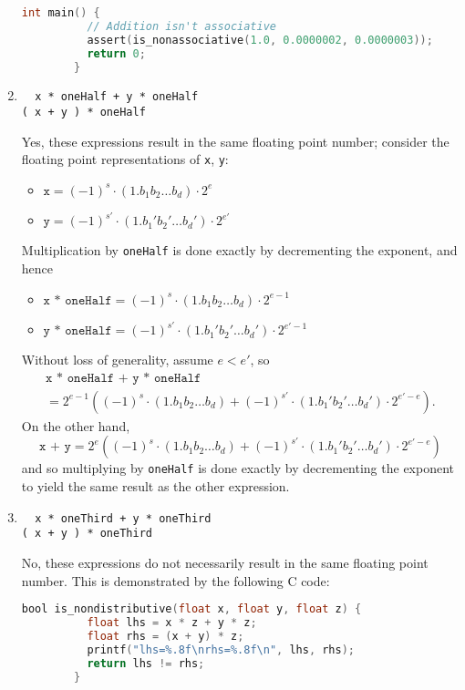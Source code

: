 \documentclass{../../../kin_math}
\begin{document}
\begin{questions}
\begin{enumerate}
\begin{solution}
\begin{lstlisting}[language=C]
        int main() {
          // Addition isn't associative
          assert(is_nonassociative(1.0, 0.0000002, 0.0000003));
          return 0;
        }
      \end{lstlisting}
    \end{solution}
    \item \begin{verbatim}
  x * oneHalf + y * oneHalf
( x + y ) * oneHalf\end{verbatim}
    \begin{solution}
      Yes, these expressions result in the same floating point number; consider the floating point representations of \texttt{x}, \texttt{y}:
      \begin{itemize}
        \item $\texttt{x} = (-1)^{s} \cdot (1.b_1b_2\dots b_d) \cdot 2^e$
        \item $\texttt{y} = (-1)^{s'} \cdot (1.b_1'b_2'\dots b_d') \cdot 2^{e'}$
      \end{itemize}
      Multiplication by \texttt{oneHalf} is done exactly by decrementing the exponent, and hence
      \begin{itemize}
        \item $\texttt{x * oneHalf} = (-1)^{s} \cdot (1.b_1b_2\dots b_d) \cdot 2^{e - 1}$
        \item $\texttt{y * oneHalf} = (-1)^{s'} \cdot (1.b_1'b_2'\dots b_d') \cdot 2^{e' - 1}$
      \end{itemize}
      Without loss of generality, assume $e < e'$, so
      \begin{multline*}
        \texttt{x * oneHalf + y * oneHalf} \\
        = 2^{e - 1}\left((-1)^{s} \cdot (1.b_1b_2\dots b_d) + (-1)^{s'} \cdot (1.b_1'b_2'\dots b_d') \cdot 2^{e' - e}\right).
      \end{multline*}
      On the other hand,
      \begin{equation*}
        \texttt{x + y} = 2^e\left((-1)^{s} \cdot (1.b_1b_2\dots b_d) + (-1)^{s'} \cdot (1.b_1'b_2'\dots b_d') \cdot 2^{e' - e}\right)
      \end{equation*}
      and so multiplying by \texttt{oneHalf} is done exactly by decrementing the exponent to yield the same result as the other expression.
    \end{solution}
    \item \begin{verbatim}
  x * oneThird + y * oneThird
( x + y ) * oneThird\end{verbatim}
    \begin{solution}
      No, these expressions do not necessarily result in the same floating point number. This is demonstrated by the following C code:
      \begin{lstlisting}[language=C]
        bool is_nondistributive(float x, float y, float z) {
          float lhs = x * z + y * z;
          float rhs = (x + y) * z;
          printf("lhs=%.8f\nrhs=%.8f\n", lhs, rhs);
          return lhs != rhs;
        }


\end{lstlisting}
\end{solution}
\end{enumerate}
\end{questions}
\end{document}
